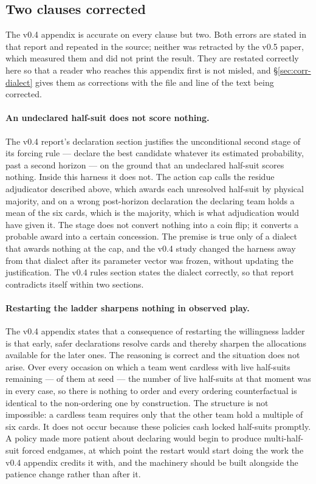 \subsection{Two clauses corrected}
\label{app:dialect-corrections}

The v0.4 appendix is accurate on every clause but two. Both errors are stated in
that report and repeated in the source; neither was retracted by the v0.5 paper,
which measured them and did not print the result. They are restated correctly
here so that a reader who reaches this appendix first is not misled, and
\S\ref{sec:corr-dialect} gives them as corrections with the file and line of the
text being corrected.

\paragraph{An undeclared half-suit does not score nothing.} The v0.4 report's
declaration section justifies the unconditional second stage of its forcing rule
--- declare the best candidate whatever its estimated probability, past a second
horizon --- on the ground that an undeclared half-suit scores nothing. Inside
this harness it does not. The action cap calls the residue adjudicator described
above, which awards each unresolved half-suit by physical majority, and on a
wrong post-horizon declaration the declaring team holds a mean
\numResidueHeld{} of the six cards, which is the majority, which is what
adjudication would have given it. The stage does not convert nothing into a coin
flip; it converts a probable award into a certain concession. The premise is
true only of a dialect that awards nothing at the cap, and the v0.4 study
changed the harness away from that dialect after its parameter vector was
frozen, without updating the justification. The v0.4 rules section states the
dialect correctly, so that report contradicts itself within two sections.

\paragraph{Restarting the ladder sharpens nothing in observed play.} The v0.4
appendix states that a consequence of restarting the willingness ladder is that
early, safer declarations resolve cards and thereby sharpen the allocations
available for the later ones. The reasoning is correct and the situation does
not arise. Over every occasion on which a team went cardless with live
half-suits remaining --- \numLadderOccasions{} of them at seed
\numLadderSeed{} --- the number of live half-suits at that moment was
\numLadderLiveSets{} in every case, so there is nothing to order and every
ordering counterfactual is identical to the non-ordering one by construction.
The structure is not impossible: a cardless team requires only that the other
team hold a multiple of six cards. It does not occur because these policies cash
locked half-suits promptly. A policy made more patient about declaring would
begin to produce multi-half-suit forced endgames, at which point the restart
would start doing the work the v0.4 appendix credits it with, and the machinery
should be built alongside the patience change rather than after it.
